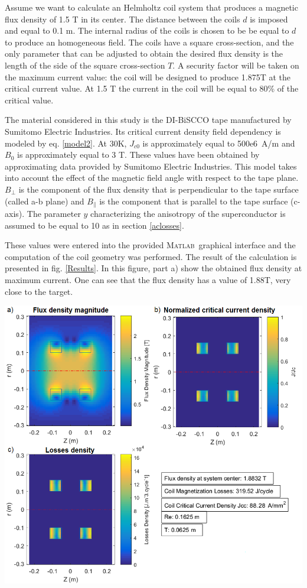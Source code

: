 \documentclass{ws-jmrr}
\newcommand{\MATLAB}{\textsc{Matlab}}
\begin{document}
\begin{multicols}{2}
Assume we want to calculate an Helmholtz coil system that produces a magnetic flux density of 1.5 T in its center. The
distance between the coils $d$ is imposed and equal to 0.1 m. The internal radius of the coils is chosen to be be equal to $d$ to produce an homogeneous field. The coils have a square cross-section, and the only parameter that can be adjusted to obtain the desired flux density is the length of the side of the square cross-section $T$. A security factor will be taken on the maximum current value: the coil will be designed to produce 1.875T at the critical current value. At 1.5 T the current in the coil will be equal to 80\% of the critical value.\par
The material considered in this study is the DI-BiSCCO tape manufactured by Sumitomo Electric Industries. Its critical current density field dependency is modeled by eq. \ref{model2}. At 30K, $J_{c0}$ is approximately equal to 500e6~A/m and $B_0$ is approximately equal to 3 T. These values have been obtained by approximating data provided by Sumitomo Electric Industries. This model takes into account the effect of the magnetic field angle with respect to the tape plane. $B_{\perp}$ is the component of the flux density that is perpendicular to the tape surface (called a-b plane) and $B_{\parallel}$ is the component that is parallel to the tape surface (c-axis). The parameter $y$ characterizing the anisotropy of the superconductor is assumed to be equal to 10 as in section \ref{aclosses}.\par
These values were entered into the provided \MATLAB ~graphical interface and the computation of the coil geometry was performed. The result of the calculation is presented in fig. \ref{Results}. In this figure, part a) show the obtained flux density at maximum current. One can see that the flux density has a value of 1.88T, very close to the target.
\begin{figurehere}
	\begin{center}
	\includegraphics[width=\linewidth]{SimResults.png}

\end{center}
\end{figurehere}
\end{multicols}
\end{document}
